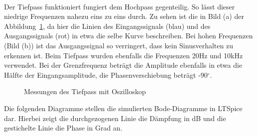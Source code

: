 \\
Der Tiefpass funktioniert fungiert dem Hochpass gegenteilig. So lässt dieser niedrige Frequenzen nahezu eins zu eins durch. Zu sehen ist die in Bild (a) der Abbildung~\ref{Tiefpass Messung}, da hier die Linien des Eingangssignals (blau) und des Ausgangssignals (rot) in etwa die selbe Kurve beschreiben. Bei hohen Frequenzen (Bild (b)) ist das Ausgangssignal so verringert, dass kein Sinusverhalten zu erkennen ist. Beim Tiefpass wurden ebenfalls die Frequenzen 20\si{\hertz} und 10\si{\kilo\hertz} verwendet. Bei der Grenzfrequenz beträgt die Amplitude ebenfalls in etwa die Hälfte der Eingangsamplitude, die Phasenverschiebung beträgt -90$^\circ$.
\begin{figure}[H]
  	\caption{Messungen des Tiefpass mit Oszilloskop}  
  	\label{Tiefpass Messung} 	
\end{figure}
Die folgenden Diagramme stellen die simulierten Bode-Diagramme in LTSpice dar.
Hierbei zeigt die durchgezogenen Linie die Dämpfung in dB und die gestichelte Linie die Phase in Grad an.
